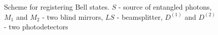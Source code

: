 \begin{figure}
\centering


\caption{Scheme for registering Bell states. $S$ - source
  of entangled photons, $M_1$ and $M_2$ - two blind mirrors, $LS$ - beamsplitter,
  $D^{(1)}$ and $D^{(2)}$ - two photodetectors}
\label{figBellReg}
\end{figure}